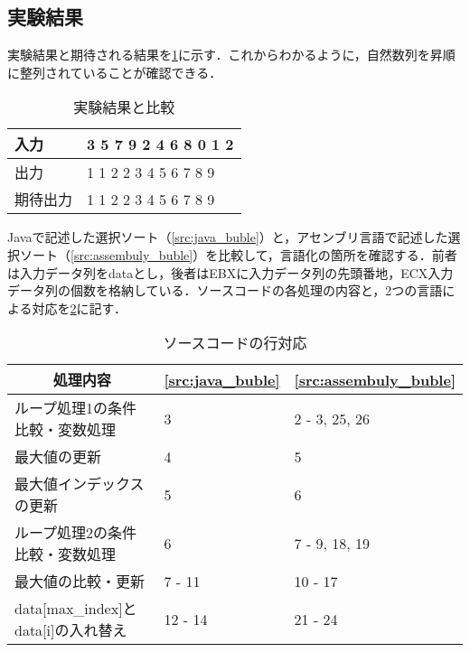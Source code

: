 \subsection{実験結果}
実験結果と期待される結果を\ref{tbl:execute}に示す．これからわかるように，自然数列を昇順に整列されていることが確認できる．\par
\begin{table}[H]
    \centering
    \caption{実験結果と比較}
    \label{tbl:execute}
    \begin{tabular}{l|l}
        入力   & {\ttfamily 1 3 5 7 9 2 4 6 8 0 1 2} \\
        \hline
        出力   & {\ttfamily 0 1 1 2 2 3 4 5 6 7 8 9} \\
        期待出力 & {\ttfamily 0 1 1 2 2 3 4 5 6 7 8 9}
    \end{tabular}
\end{table}
{\ttfamily Java}で記述した選択ソート（\ref{src:java_buble}）と，アセンブリ言語で記述した選択ソート（\ref{src:assembuly_buble}）を比較して，言語化の箇所を確認する．前者は入力データ列を{\ttfamily data}とし，後者は{\ttfamily EBX}に入力データ列の先頭番地，{\ttfamily ECX}入力データ列の個数を格納している．ソースコードの各処理の内容と，2つの言語による対応を\ref{tbl:ソースコードの行対応}に記す．
\begin{table}[htbp]
    \centering
    \caption{ソースコードの行対応}
    \label{tbl:ソースコードの行対応}
    \begin{tabular}{p{10cm}p{2cm}p{2cm}}
        \multicolumn{1}{c}{処理内容}                              & \multicolumn{1}{c}{\ref{src:java_buble}} & \multicolumn{1}{c}{\ref{src:assembuly_buble}} \\
        \hline
        ループ処理1の条件比較・変数処理                                      & 3                                        & 2 - 3, 25, 26                                 \\
        最大値の更新                                                & 4                                        & 5                                             \\
        最大値インデックスの更新                                          & 5                                        & 6                                             \\
        ループ処理2の条件比較・変数処理                                      & 6                                        & 7 - 9, 18, 19                                 \\
        最大値の比較・更新                                             & 7 - 11                                   & 10 - 17                                       \\
        {\ttfamily data[max\_index]}と{\ttfamily data[i]}の入れ替え & 12 - 14                                  & 21 - 24                                       \\
        \hline
    \end{tabular}
\end{table}\\
